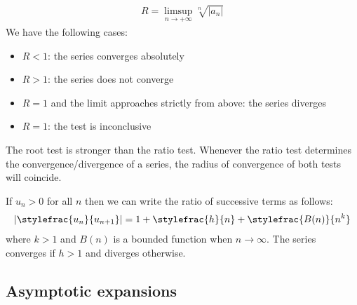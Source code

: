 	\begin{method}
		\begin{gather}
			R = \limsup_{n\rightarrow+\infty}\sqrt[n]{|a_n|}
		\end{gather}
	        We have the following cases:
	        \begin{itemize}
			\item $R < 1$: the series converges absolutely
		        \item $R > 1$: the series does not converge
		        \item $R = 1$ and the limit approaches strictly from above: the series diverges
		        \item $R = 1$: the test is inconclusive
		\end{itemize}
	\end{method}
	\begin{remark}
		The root test is stronger than the ratio test. Whenever the ratio test determines the convergence/divergence of a series, the radius of convergence of both tests will coincide.
	\end{remark}

	\begin{method}
		If $u_n>0$ for all $n$ then we can write the ratio of successive terms as follows:
		\begin{gather}
			\label{series:gauss_test}
		        \left|\stylefrac{u_n}{u_{n+1}}\right| = 1 + \stylefrac{h}{n} + \stylefrac{B(n)}{n^k}
		\end{gather}
		where $k > 1$ and $B(n)$ is a bounded function when $n\rightarrow\infty$. The series converges if $h > 1$ and diverges otherwise.
    	\end{method}

\subsection{Asymptotic expansions}
	
    
